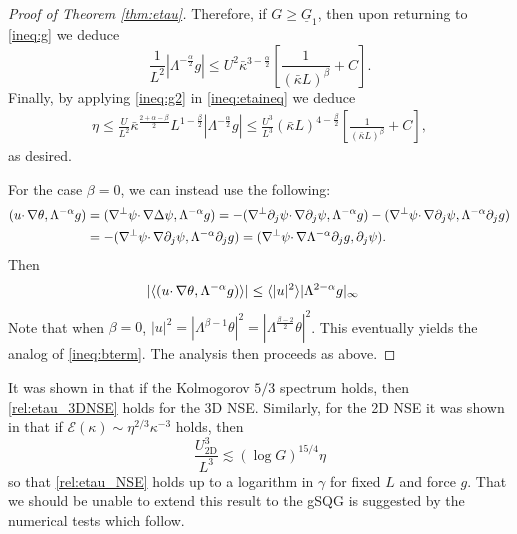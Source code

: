 \documentclass[twoside, reqno]{amsart}
\numberwithin{lemma}{section}
\numberwithin{theorem}{section}
\numberwithin{proposition}{section}
\numberwithin{equation}{section} %
\newcommand{\la}{\Lambda}
\newcommand{\ka}{\kappa}
\newcommand{\bkap}{\bar{\kap}}
\newcommand{\Gb}{\underline{G}}
\newcommand{\al}{\alpha}
\newcommand{\be}{\beta}
\newcommand{\De}{\Delta}
\newcommand{\kap}{\kappa}
\newcommand{\Lam}{\Lambda}
\newcommand{\tht}{\theta}
\newcommand{\bdy}{\partial}
\newcommand{\lb}{\langle}
\newcommand{\rb}{\rangle}
\begin{document}
\begin{proof}[Proof of Theorem \ref{thm:etau}]
{Therefore, if $G\geq \Gb_1$, then upon returning to  \eqref{ineq:g} we deduce}
    \begin{equation} \label{ineq:g2}
        \frac{1}{L^2} |\la^{-\frac{\alpha}{2}} g| \le U^2 \bar{\ka}^{3-\frac{\alpha}{2}} \left[{\frac{1}{(\bar{\ka}L)^{\beta}}}+C\right].
    \end{equation}
{Finally, by applying \eqref{ineq:g2} in \eqref{ineq:etaineq} we deduce}
    \begin{equation*}
    \begin{split}
        \eta 
        \leq\frac{U}{L^2} \bar{\ka}^{\frac{2+\alpha-\beta}{2}}{L^{1-\frac{\beta}{2}}} |\la^{-\frac{\alpha}{2}}g|
        \leq {\frac{U^3}{L^3}\left(\bkap L\right)^{4-\frac{\be}2}\left[\frac{1}{(\bkap L)^\be}+C\right]},
    \end{split}
    \end{equation*}
{as desired.}

For the case $\be=0$, we can instead use the following:
\begin{align}
    (u\cdotp\nabla\tht,\Lam^{-\al}g)&=(\nabla^\perp\psi\cdotp\nabla\De\psi,\Lam^{-\al}g)=-(\nabla^\perp\bdy_j\psi\cdotp\nabla\bdy_j\psi,\Lam^{-\al}g)-(\nabla^\perp\psi\cdotp\nabla\bdy_j\psi,\Lam^{-\al}\bdy_jg)\notag
    \\
    &=-(\nabla^\perp\psi\cdotp\nabla\bdy_j\psi,\Lam^{-\al}\bdy_jg)=(\nabla^\perp\psi\cdotp\nabla\Lam^{-\al}\bdy_jg,\bdy_j\psi).\notag
\end{align}
Then
    \begin{align}
        |\lb(u\cdotp\nabla\tht,\Lam^{-\al}g)\rb|&\leq \lb|u|^2\rb|\Lam^{2-\al}g|_\infty\notag
    \end{align}
Note that when $\be=0$, $|u|^2=|\Lam^{\be-1}\tht|^2=|\Lam^{\frac{\be-2}{2}}\tht|^2$. This eventually yields the analog of \eqref{ineq:bterm}. The analysis then proceeds as above.
\end{proof}



It was shown in \cite{Dascaliuc2009} that if the Kolmogorov $5/3$ spectrum holds, then \eqref{rel:etau_3DNSE} holds for the 3D NSE.  Similarly, for the 2D NSE it was shown in \cite{Dascaliuc2008} that if $\mathcal{E}(\ka) \sim \eta^{2/3}\ka^{-3}$ holds, then 
\begin{equation}\label{uptolog}
 \frac{U_{\text{2D}}^3}{L^3} \lesssim (\log G)^{15/4} \eta 
\end{equation}
so that \eqref{rel:etau_NSE} holds up to a logarithm in $\gamma$ for fixed $L$ and force $g$.  That we should be unable to extend this result to the gSQG is suggested by the numerical tests which follow.
\end{document}
